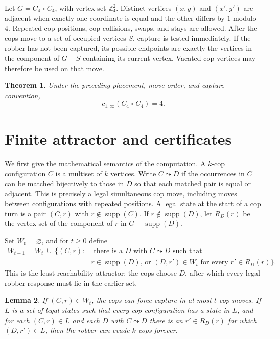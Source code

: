 \documentclass[11pt]{article}
\newtheorem{theorem}{Theorem}
\newtheorem{lemma}[theorem]{Lemma}
\newcommand{\Z}{\mathbb Z}
\newcommand{\supp}{\operatorname{supp}}
\begin{document}
Let $G=C_4\mathbin{\square}C_4$, with vertex set $\Z_4^2$.  Distinct
vertices $(x,y)$ and $(x',y')$ are adjacent when exactly one coordinate is
equal and the other differs by $1$ modulo $4$.  Repeated cop positions,
cop collisions, swaps, and stays are allowed.  After the cops move to a set of
occupied vertices $S$, capture is tested immediately.  If the robber has not
been captured, its possible endpoints are exactly the vertices in the
component of $G-S$ containing its current vertex.  Vacated cop vertices may
therefore be used on that move.

\begin{theorem}\label{thm:main}
Under the preceding placement, move-order, and capture convention,
\[
  c_{1,\infty}(C_4\mathbin{\square}C_4)=4.
\]
\end{theorem}

\section{Finite attractor and certificates}

We first give the mathematical semantics of the computation.  A $k$-cop
configuration $C$ is a multiset of $k$ vertices.  Write $C\leadsto D$ if
the occurrences in $C$ can be matched bijectively to those in $D$ so that
each matched pair is equal or adjacent.  This is precisely a legal
simultaneous cop move, including moves between configurations with repeated
positions.  A legal state at the start of a cop turn is a pair $(C,r)$ with
$r\notin\supp(C)$.  If $r\notin\supp(D)$, let $R_D(r)$ be the vertex set
of the component of $r$ in $G-\supp(D)$.

Set $W_0=\varnothing$, and for $t\geq0$ define
\begin{align*}
W_{t+1}=W_t\ \cup\ 
\bigl\{(C,r):{}&\text{ there is a }D\text{ with }C\leadsto D\text{ such that}\\
&r\in\supp(D)\text{, or }(D,r')\in W_t
  \text{ for every }r'\in R_D(r)\bigr\}.
\end{align*}
This is the least reachability attractor: the cops choose $D$, after which
every legal robber response must lie in the earlier set.

\begin{lemma}\label{lem:rank}
If $(C,r)\in W_t$, the cops can force capture in at most $t$ cop moves.
If $L$ is a set of legal states such that every cop configuration has a
state in $L$, and for each $(C,r)\in L$ and each $D$ with
$C\leadsto D$ there is an $r'\in R_D(r)$ for which $(D,r')\in L$, then
the robber can evade $k$ cops forever.
\end{lemma}
\end{document}
